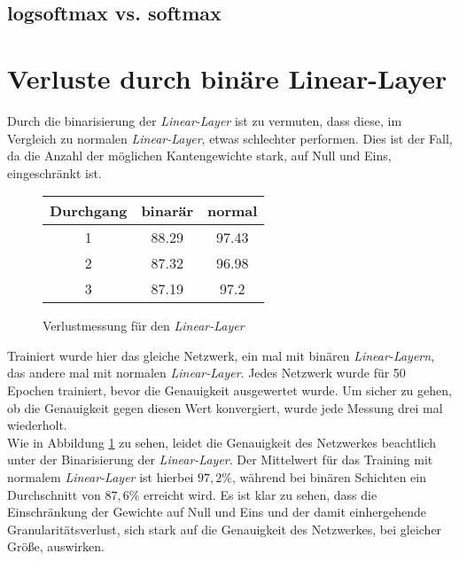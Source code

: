 \subsection{logsoftmax vs. softmax}
\section{Verluste durch binäre Linear-Layer}
Durch die binarisierung der \textit{Linear-Layer} ist zu vermuten, dass diese, im Vergleich zu normalen \textit{Linear-Layer}, etwas schlechter performen. Dies ist der Fall, da die Anzahl der möglichen Kantengewichte stark, auf Null und Eins, eingeschränkt ist. 
\begin{figure}[h]
	\centering
	\begin{tabular}{|c|c|c|}\hline
		Durchgang&binarär&normal\\\hline
		1&88.29&97.43\\\hline
		2&87.32&96.98\\\hline
		3&87.19&97.2\\\hline
	\end{tabular}
\caption{Verlustmessung für den \textit{Linear-Layer}}
\label{fig:linar-layer-verluste}
\end{figure}


Trainiert wurde hier das gleiche Netzwerk, ein mal mit binären \textit{Linear-Layern}, das andere mal mit normalen \textit{Linear-Layer}. Jedes Netzwerk wurde für 50 Epochen trainiert, bevor die Genauigkeit ausgewertet wurde. Um sicher zu gehen, ob die Genauigkeit gegen diesen Wert konvergiert, wurde jede Messung drei mal wiederholt.\\
Wie in Abbildung \ref{fig:linar-layer-verluste} zu sehen, leidet die Genauigkeit des Netzwerkes beachtlich unter der Binarisierung der \textit{Linear-Layer}. Der Mittelwert für das Training mit normalem \textit{Linear-Layer} ist hierbei $97,2\%$, während bei binären Schichten ein Durchschnitt von $87,6\%$ erreicht wird. Es ist klar zu sehen, dass die Einschränkung der Gewichte auf Null und Eins und der damit einhergehende Granularitätsverlust, sich stark auf die Genauigkeit des Netzwerkes, bei gleicher Größe, auswirken. 

